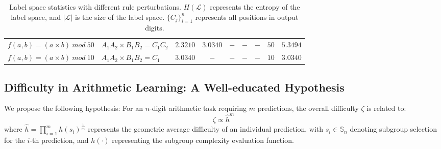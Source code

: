 \documentclass[11pt]{article}
\begin{document}
\begin{table}[ht]
{\begin{tabular}{llccccccc}
$f(a,b) = (a \times b) \: mod \: 50 $ & $A_1A_2 \times B_1B_2=C_1C_2$  & $2.3210$ & $3.0340$ & $-$ & $-$ & $-$ & $50$ &$5.3494$ \\
$f(a,b) = (a \times b) \: mod \: 10 $ & $A_1A_2 \times B_1B_2=C_1$  & $3.0340$ & $-$ & $-$ & $-$ & $-$ & $10$ &$3.0340$ \\
\bottomrule
\end{tabular}}
\caption{Label space statistics with different rule perturbations. $H(\mathcal{L})$ represents the entropy of the label space, and $|\mathcal{L}|$ is the size of the label space. $\{C_j\}_{i=1}^{n}$ represents all positions in output digits.}
\label{tab:subgroup-space}
\vspace{-0.4cm}
\end{table}
\subsection{Difficulty in Arithmetic Learning: A Well-educated Hypothesis}
\label{sec:difficulty}
We propose the following hypothesis:
For an $n$-digit arithmetic task requiring $m$ predictions, the overall difficulty $\zeta$ is related to:
\begin{equation}
\zeta \propto \hat h^m
\end{equation}
where $\hat h=\prod_{i=1}^{m} h(s_i)^\frac{1}{m}$ represents the geometric average difficulty of an individual prediction, with $s_i \in \mathbb{S}_n$ denoting subgroup selection for the $i$-th prediction, and $h(\cdot)$ representing the subgroup complexity evaluation function.
\end{document}
